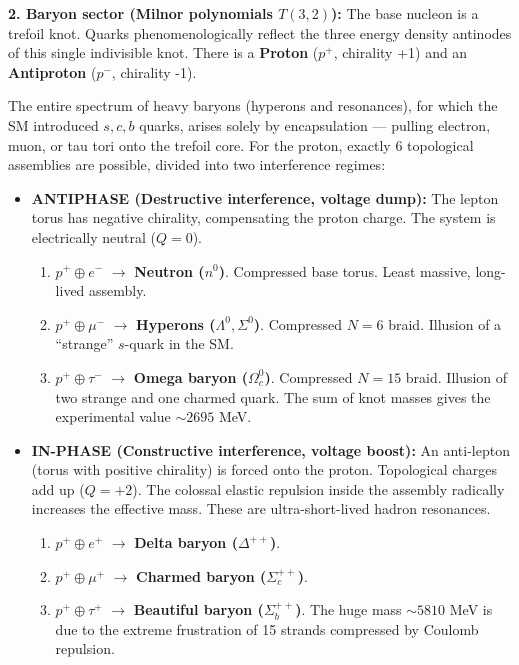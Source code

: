 \documentclass[11pt,a4paper]{article}
\begin{document}
\textbf{2. Baryon sector (Milnor polynomials $T(3,2)$):}
The base nucleon is a trefoil knot. Quarks phenomenologically reflect the three energy density antinodes of this single indivisible knot. There is a \textbf{Proton} ($p^+$, chirality +1) and an \textbf{Antiproton} ($p^-$, chirality -1).

The entire spectrum of heavy baryons (hyperons and resonances), for which the SM introduced $s, c, b$ quarks, arises solely by encapsulation — pulling electron, muon, or tau tori onto the trefoil core. For the proton, exactly 6 topological assemblies are possible, divided into two interference regimes:
\begin{itemize}
\item \textbf{ANTIPHASE (Destructive interference, voltage dump):} The lepton torus has negative chirality, compensating the proton charge. The system is electrically neutral ($Q=0$).
\begin{enumerate}
\item $p^+ \oplus e^-$ $\longrightarrow$ \textbf{Neutron ($n^0$)}. Compressed base torus. Least massive, long-lived assembly.
\item $p^+ \oplus \mu^-$ $\longrightarrow$ \textbf{Hyperons ($\Lambda^0, \Sigma^0$)}. Compressed $N=6$ braid. Illusion of a ``strange'' $s$-quark in the SM.
\item $p^+ \oplus \tau^-$ $\longrightarrow$ \textbf{Omega baryon ($\Omega_c^0$)}. Compressed $N=15$ braid. Illusion of two strange and one charmed quark. The sum of knot masses gives the experimental value $\sim 2695$ MeV.
\end{enumerate}

\item \textbf{IN-PHASE (Constructive interference, voltage boost):} An anti-lepton (torus with positive chirality) is forced onto the proton. Topological charges add up ($Q=+2$). The colossal elastic repulsion inside the assembly radically increases the effective mass. These are ultra-short-lived hadron resonances.
\begin{enumerate}
\item $p^+ \oplus e^+$ $\longrightarrow$ \textbf{Delta baryon ($\Delta^{++}$)}.
\item $p^+ \oplus \mu^+$ $\longrightarrow$ \textbf{Charmed baryon ($\Sigma_c^{++}$)}.
\item $p^+ \oplus \tau^+$ $\longrightarrow$ \textbf{Beautiful baryon ($\Sigma_b^{++}$)}. The huge mass $\sim 5810$ MeV is due to the extreme frustration of 15 strands compressed by Coulomb repulsion.
\end{enumerate}
\end{itemize}
\end{document}
